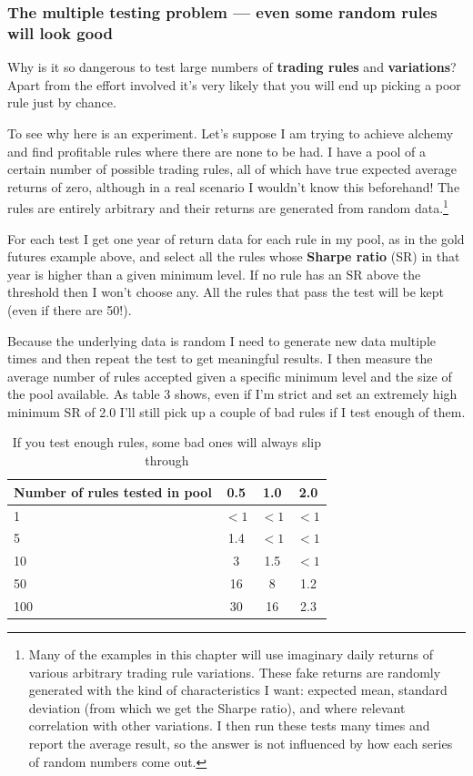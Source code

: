 \subsubsection*{The multiple testing problem --- even some random rules will look good}

Why is it so dangerous to test large numbers of \textbf{trading rules} and \textbf{variations}? Apart from the effort involved it's very likely that you will end up picking a poor rule just by chance.

To see why here is an experiment. Let's suppose I am trying to achieve alchemy and find profitable rules where there are none to be had. I have a pool of a certain number of possible trading rules, all of which have true expected average returns of zero, although in a real scenario I wouldn't know this beforehand! The rules are entirely arbitrary and their returns are generated from random data.\footnote{Many of the examples in this chapter will use imaginary daily returns of various arbitrary trading rule variations. These fake returns are randomly generated with the kind of characteristics I want: expected mean, standard deviation (from which we get the Sharpe ratio), and where relevant correlation with other variations. I then run these tests many times and report the average result, so the answer is not influenced by how each series of random numbers come out.}

For each test I get one year of return data for each rule in my pool, as in the gold futures example above, and select all the rules whose \textbf{Sharpe ratio} (SR) in that year is higher than a given minimum level. If no rule has an SR above the threshold then I won't choose any. All the rules that pass the test will be kept (even if there are 50!).

Because the underlying data is random I need to generate new data multiple times and then repeat the test to get meaningful results. I then measure the average number of rules accepted given a specific minimum level and the size of the pool available. As table 3 shows, even if I'm strict and set an extremely high minimum SR of 2.0 I'll still pick up a couple of bad rules if I test enough of them.

\begin{table}[htbp] \centering \small \caption{If you test enough rules, some bad ones will always slip through} \begin{tabular}{@{} lccc@{}}
\toprule
Number of rules tested in pool & 0.5 & 1.0 & 2.0 \\
\midrule
1 & $<1$ & $<1$ & $<1$ \\
5 & 1.4 & $<1$ & $<1$ \\
10 & 3 & 1.5 & $<1$ \\
50 & 16 & 8 & 1.2 \\
100 & 30 & 16 & 2.3 \\
\bottomrule
\end{tabular}
\end{table}

